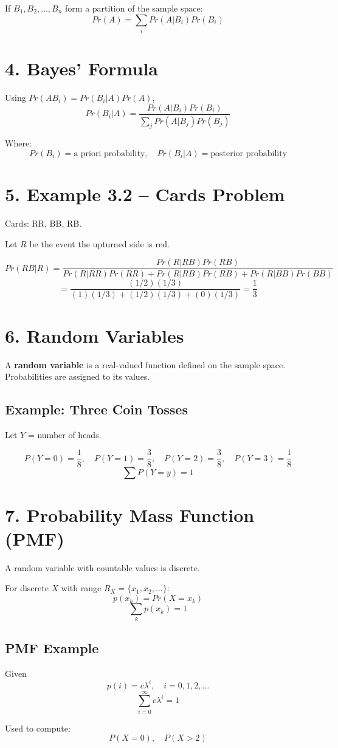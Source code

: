 \documentclass[12pt]{article}
\begin{document}
If $B_1, B_2, \dots, B_n$ form a partition of the sample space:
\[
Pr(A)=\sum_i Pr(A|B_i)Pr(B_i)
\]

\section*{4. Bayes’ Formula}

Using $Pr(AB_i)=Pr(B_i|A)Pr(A)$,
\[
Pr(B_i|A)=\frac{Pr(A|B_i)Pr(B_i)}{\sum_j Pr(A|B_j)Pr(B_j)}
\]

Where:
\[
Pr(B_i) = \text{a priori probability}, \quad
Pr(B_i|A) = \text{posterior probability}
\]

\section*{5. Example 3.2 -- Cards Problem}

Cards: RR, BB, RB.

Let $R$ be the event the upturned side is red.

\[
Pr(RB|R)=\frac{Pr(R|RB)Pr(RB)}{Pr(R|RR)Pr(RR)+Pr(R|RB)Pr(RB)+Pr(R|BB)Pr(BB)}
\]
\[
=\frac{(1/2)(1/3)}{(1)(1/3)+(1/2)(1/3)+(0)(1/3)}=\frac{1}{3}
\]

\section*{6. Random Variables}

A \textbf{random variable} is a real-valued function defined on the sample space. Probabilities are assigned to its values.

\subsection*{Example: Three Coin Tosses}

Let $Y$ = number of heads.

\[
P(Y=0)=\frac{1}{8}, \quad
P(Y=1)=\frac{3}{8}, \quad
P(Y=2)=\frac{3}{8}, \quad
P(Y=3)=\frac{1}{8}
\]
\[
\sum P(Y=y)=1
\]

\section*{7. Probability Mass Function (PMF)}

A random variable with countable values is discrete.

For discrete $X$ with range $R_X = \{x_1,x_2,\dots\}$:
\[
p(x_k)=Pr(X=x_k)
\]
\[
\sum_k p(x_k)=1
\]

\subsection*{PMF Example}

Given
\[
p(i)=c\lambda^i, \quad i=0,1,2,\dots
\]
\[
\sum_{i=0}^{\infty} c\lambda^i = 1
\]

Used to compute:
\[
P(X=0), \quad P(X>2)
\]
\end{document}
